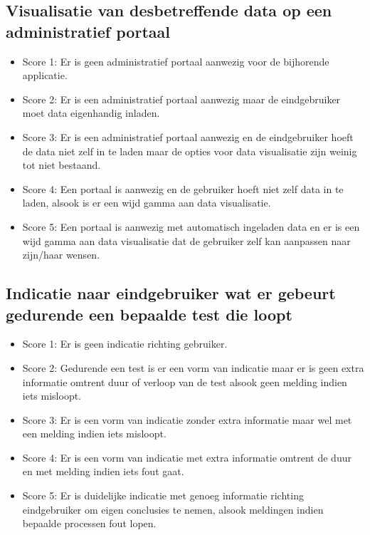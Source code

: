 \subsection{Visualisatie van desbetreffende data op een administratief portaal}

\begin{itemize}
    \item Score 1: Er is geen administratief portaal aanwezig voor de bijhorende applicatie.
    \item Score 2: Er is een administratief portaal aanwezig maar de eindgebruiker moet data eigenhandig inladen.
    \item Score 3: Er is een administratief portaal aanwezig en de eindgebruiker hoeft de data niet zelf in te laden maar de opties voor data visualisatie zijn weinig tot niet bestaand.
    \item Score 4: Een portaal is aanwezig en de gebruiker hoeft niet zelf data in te laden, alsook is er een wijd gamma aan data visualisatie.
    \item Score 5: Een portaal is aanwezig met automatisch ingeladen data en er is een wijd gamma aan data visualisatie dat de gebruiker zelf kan aanpassen naar zijn/haar wensen.
\end{itemize}

\subsection{Indicatie naar eindgebruiker wat er gebeurt gedurende een bepaalde test die loopt}

\begin{itemize}
    \item Score 1: Er is geen indicatie richting gebruiker.
    \item Score 2: Gedurende een test is er een vorm van indicatie maar er is geen extra informatie omtrent duur of verloop van de test alsook geen melding indien iets misloopt.
    \item Score 3: Er is een vorm van indicatie zonder extra informatie maar wel met een melding indien iets misloopt.
    \item Score 4: Er is een vorm van indicatie met extra informatie omtrent de duur en met melding indien iets fout gaat.
    \item Score 5: Er is duidelijke indicatie met genoeg informatie richting eindgebruiker om eigen conclusies te nemen, alsook meldingen indien bepaalde processen fout lopen.
\end{itemize}

